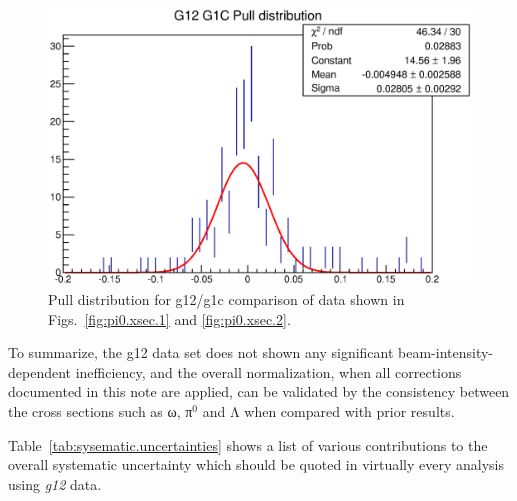 \begin{figure}[htpb]\begin{center}
\includegraphics[width=0.7\columnwidth]{figures/xsec/G12_Pi0_XSection_pull.eps}
\caption{\label{fig:pi0.xsec.pull}Pull distribution for g12/g1c comparison of data shown in Figs.~\ref{fig:pi0.xsec.1} and \ref{fig:pi0.xsec.2}.}
\end{center}\end{figure}

To summarize, the g12 data set does not shown any significant beam-intensity-dependent inefficiency, and the overall normalization, when all corrections documented in this note are applied, can be validated by the consistency between the cross sections such as ω, π$^0$ and Λ when compared with prior results. \begin{v2}Table~\ref{tab:sysematic.uncertainties} shows a list of various contributions to the overall systematic uncertainty which should be quoted in virtually every analysis using \emph{g12} data.\end{v2}



